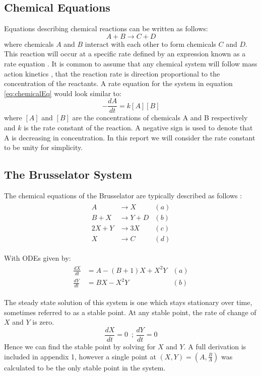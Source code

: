 \documentclass[reprint, amsmath, amssymb, aps]{revtex4-2}
\begin{document}
\subsection{Chemical Equations}
Equations describing chemical reactions can be written as follows:
\begin{equation}
	A + B \rightarrow C + D
	\label{eq:chemicalEq}
\end{equation}where chemicals $A$ and $B$ interact with each other to form chemicals $C$ and $D$. This reaction will occur at a specific rate defined by an expression known as a rate equation \cite{dynamics}. It is common to assume that any chemical system will follow mass action kinetics \citep{dynamics}\cite{massAction}, that the reaction rate is direction proportional to the concentration of the reactants. A rate equation for the system in equation \ref{eq:chemicalEq} would look similar to:
\begin{equation}
	-\frac{dA}{dt} = k[A][B]
\end{equation}where $[A]$ and $[B]$ are the concentrations of chemicals A and B respectively and $k$ is the rate constant of the reaction. A negative sign is used to denote that A is decreasing in concentration. In this report we will consider the rate constant to be unity for simplicity.

\subsection{The Brusselator System}
The chemical equations of the Brusselator are typically described as follows \cite{manual}:
\begin{align}
	\begin{aligned}
	A &\rightarrow X & (a)\\
	B + X &\rightarrow Y + D & (b)\\
	2X + Y &\rightarrow 3X & (c)\\
	X &\rightarrow C & (d)
	\end{aligned}
\end{align}

With ODEs given by:
\begin{align}
	\begin{aligned}
	\frac{dX}{dt} &= A - (B + 1)X + X^2 Y & (a)\\
	\frac{dY}{dt} &= BX - X^2 Y & (b)
	\end{aligned}
	\label{eq:rate}
\end{align}

The steady state solution of this system is one which stays stationary over time, sometimes referred to as a stable point. At any stable point, the rate of change of $X$ and $Y$ is zero.
\begin{equation}
	\frac{dX}{dt}=0\,\text{  ;  }\frac{dY}{dt}=0
\end{equation}Hence we can find the stable point by solving for $X$ and $Y$. A full derivation is included in appendix 1, however a single point at $(X, Y) = \left(A, \frac{B}{A}\right)$ was calculated to be the only stable point in the system.\\
\end{document}
